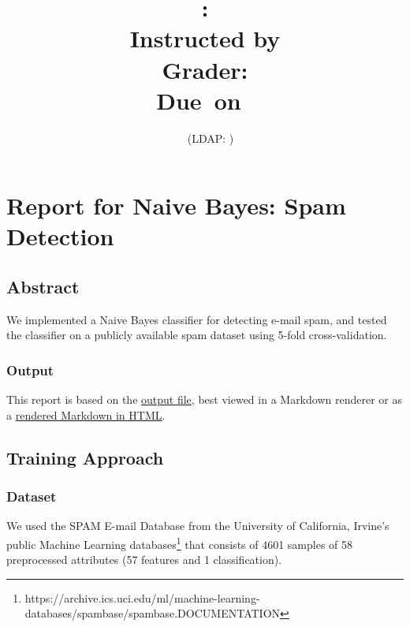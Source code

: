 \documentclass[letterpaper]{article}
\title{\textmd{\bf \Class: \Title}\\{\large Instructed by \textit{\ClassInstructor}}\\{\vspace{-0.1in}\small Grader: \textit{\ClassGrader}}\\\normalsize\vspace{0.1in}\small{Due\ on\ \DueDate}}
\author{\textbf{\StudentName}\ \ (LDAP: \StudentLDAP)}
\begin{document}
\maketitle \thispagestyle{fpfancy}


\section{Report for Naive Bayes: Spam Detection}
\subsection{Abstract}
We implemented a Naive Bayes classifier for detecting e-mail spam, and tested the classifier on a publicly available spam dataset using 5-fold cross-validation.
\subsubsection{Output}
This report is based on the \href{run:output.md}{output file}, best viewed in a Markdown renderer or as a \href{run:output.html}{rendered Markdown in HTML}.
\subsection{Training Approach}
\subsubsection{Dataset}
We used the SPAM E-mail Database from the University of California, Irvine's public Machine Learning databases\footnote{https://archive.ics.uci.edu/ml/machine-learning-databases/spambase/spambase.DOCUMENTATION} that consists of 4601 samples of 58 preprocessed attributes (57 features and 1 classification).
\end{document}
